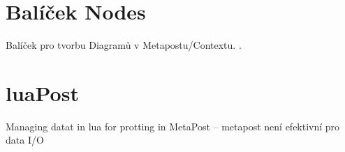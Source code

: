 \section{Balíček Nodes}

Balíček pro tvorbu Diagramů v Metapostu/Contextu. .

\section{luaPost}

Managing datat in lua for protting in MetaPost -- metapost není efektivní pro data I/O

